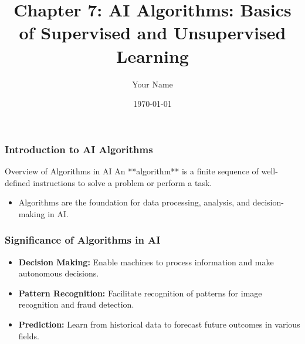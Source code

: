 \documentclass{beamer}
\title{Chapter 7: AI Algorithms: Basics of Supervised and Unsupervised Learning}
\author{Your Name}
\institute{Your Institution}
\date{\today}
\begin{document}
\frame{\titlepage}

\begin{frame}[fragile]
    \frametitle{Introduction to AI Algorithms}
    \begin{block}{Overview of Algorithms in AI}
        An **algorithm** is a finite sequence of well-defined instructions to solve a problem or perform a task. 
    \end{block}
    \begin{itemize}
        \item Algorithms are the foundation for data processing, analysis, and decision-making in AI.
    \end{itemize}
\end{frame}

\begin{frame}[fragile]
    \frametitle{Significance of Algorithms in AI}
    \begin{itemize}
        \item \textbf{Decision Making:} Enable machines to process information and make autonomous decisions.
        \item \textbf{Pattern Recognition:} Facilitate recognition of patterns for image recognition and fraud detection.
        \item \textbf{Prediction:} Learn from historical data to forecast future outcomes in various fields.
    \end{itemize}
\end{frame}
\end{document}
